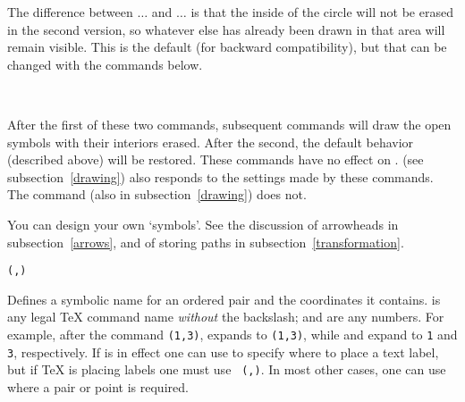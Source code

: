 \documentclass[letterpaper]{article}
\begin{document}
The difference between $\ldots$ and
$\ldots$ is that the inside of the circle
will not be erased in the second version, so whatever else has already
been drawn in that area will remain visible. This is the default (for
backward compatibility), but that can be changed with the commands
below.

\begin{cd}
\\
%
%
\end{cd}

After the first of these two commands, subsequent 
commands will draw the open symbols with their interiors erased. After
the second, the default behavior (described above) will be restored.
These commands have no effect on .  (see
subsection~\ref{drawing}) also responds to the settings made by these
commands. The  command (also in subsection~\ref{drawing}) does
not.

You can design your own `symbols'. See the discussion of arrowheads in
subsection~\ref{arrows}, and of storing paths in
subsection~\ref{transformation}.

\begin{cd}
\texttt{(,)}%
\end{cd}

Defines a symbolic name for an ordered pair and the coordinates it
contains.  is any legal \TeX{} command name \emph{without}
the backslash;  and  are any numbers. For
example, after the command \texttt{(1,3)}, 
expands to \texttt{(1,3)}, while  and  expand to
\texttt{1} and \texttt{3}, respectively. If  is in effect
one can use  to specify where to place a text label, but if \TeX{}
is placing labels one must use \texttt{ (,)}. In most
other cases, one can use  where a pair or point is required.

\begin{cd}
\\
%
%
\end{cd}
\end{document}
